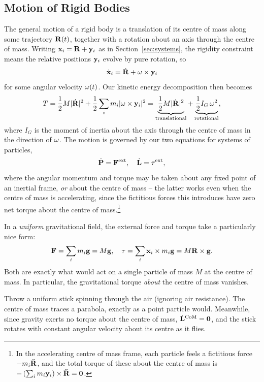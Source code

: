 \documentclass[a4paper]{scrartcl}
\begin{document}
\subsection{Motion of Rigid Bodies}

The general motion of a rigid body is a translation of its centre of mass along some trajectory $\mathbf{R}(t)$, together with a rotation about an axis through the centre of mass. Writing $\mathbf{x}_i = \mathbf{R} + \mathbf{y}_i$ as in Section~\ref{sec:systems}, the rigidity constraint means the relative positions $\mathbf{y}_i$ evolve by pure rotation, so
$$
\dot{\mathbf{x}}_i = \dot{\mathbf{R}} + \mathbf{\omega} \times \mathbf{y}_i
$$
for some angular velocity $\mathbf{\omega}(t)$. Our kinetic energy decomposition then becomes
$$
T = \frac{1}{2}M |\dot{\mathbf{R}}|^2 + \frac{1}{2}\sum_i m_i |\mathbf{\omega} \times \mathbf{y}_i|^2 = \underbrace{\frac{1}{2}M|\dot{\mathbf{R}}|^2}_{\text{translational}} + \underbrace{\frac{1}{2}I_G\, \omega^2}_{\text{rotational}},
$$
where $I_G$ is the moment of inertia about the axis through the centre of mass in the direction of $\mathbf{\omega}$. The motion is governed by our two equations for systems of particles,
$$
\dot{\mathbf{P}} = \mathbf{F}^{\text{ext}}, \quad \dot{\mathbf{L}} = \mathbf{\tau}^{\text{ext}},
$$
where the angular momentum and torque may be taken about any fixed point of an inertial frame, \emph{or} about the centre of mass -- the latter works even when the centre of mass is accelerating, since the fictitious forces this introduces have zero net torque about the centre of mass.\footnote{In the accelerating centre of mass frame, each particle feels a fictitious force $-m_i \ddot{\mathbf{R}}$, and the total torque of these about the centre of mass is $-\left(\sum_i m_i \mathbf{y}_i\right) \times \ddot{\mathbf{R}} = \mathbf{0}$.}

In a \emph{uniform} gravitational field, the external force and torque take a particularly nice form:
$$
\mathbf{F} = \sum_i m_i \mathbf{g} = M \mathbf{g}, \quad \mathbf{\tau} = \sum_i \mathbf{x}_i \times m_i \mathbf{g} = M \mathbf{R} \times \mathbf{g}.
$$
Both are exactly what would act on a single particle of mass $M$ at the centre of mass. In particular, the gravitational torque \emph{about} the centre of mass vanishes.

\begin{example}
	Throw a uniform stick spinning through the air (ignoring air resistance). The centre of mass traces a parabola, exactly as a point particle would. Meanwhile, since gravity exerts no torque about the centre of mass, $\dot{\mathbf{L}}^{\text{CoM}} = \mathbf{0}$, and the stick rotates with constant angular velocity about its centre as it flies.
\end{example}
\end{document}
